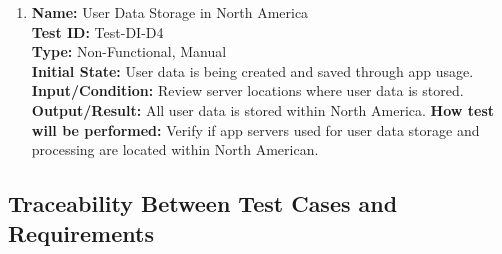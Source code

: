 \documentclass[12pt, titlepage]{article}
\begin{document}
\begin{enumerate}
  \item \textbf{Name:} User Data Storage in North America \label{itm:Test-DI-D4} \\
        \textbf{Test ID:} Test-DI-D4 \\
        \textbf{Type:} Non-Functional, Manual \\
        \textbf{Initial State:} User data is being created and saved through app usage. \\
        \textbf{Input/Condition:} Review server locations where user data is stored. \\
        \textbf{Output/Result:} All user data is stored within North America.
        \textbf{How test will be performed:} Verify if app servers used for user data storage and processing are located within North American. \\

\end{enumerate}

\subsection{Traceability Between Test Cases and Requirements}
\end{document}
